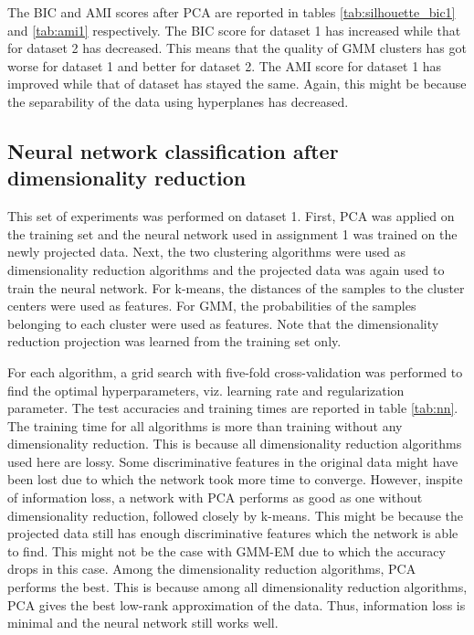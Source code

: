 \documentclass[letterpaper]{article}
\begin{document}
	The BIC and AMI scores after PCA are reported in tables \ref{tab:silhouette_bic1} and \ref{tab:ami1} respectively. The BIC score for dataset 1 has increased while that for dataset 2 has decreased. This means that the quality of GMM clusters has got worse for dataset 1 and better for dataset 2. The AMI score for dataset 1 has improved while that of dataset has stayed the same. Again, this might be because the separability of the data using hyperplanes has decreased.
	
	\subsection{Neural network classification after dimensionality reduction}
	This set of experiments was performed on dataset 1. First, PCA was applied on the training set and the neural network used in assignment 1 was trained on the newly projected data. Next, the two clustering algorithms were used as dimensionality reduction algorithms and the projected data was again used to train the neural network. For k-means, the distances of the samples to the cluster centers were used as features. For GMM, the probabilities of the samples belonging to each cluster were used as features. Note that the dimensionality reduction projection was learned from the training set only.
	
	For each algorithm, a grid search with five-fold cross-validation was performed to find the optimal hyperparameters, viz. learning rate and regularization parameter. The test accuracies and training times are reported in table \ref{tab:nn}. The training time for all algorithms is more than training without any dimensionality reduction. This is because all dimensionality reduction algorithms used here are lossy. Some discriminative features in the original data might have been lost due to which the network took more time to converge. However, inspite of information loss, a network with PCA performs as good as one without dimensionality reduction, followed closely by k-means. This might be because the projected data still has enough discriminative features which the network is able to find. This might not be the case with GMM-EM due to which the accuracy drops in this case. Among the dimensionality reduction algorithms, PCA performs the best. This is because among all dimensionality reduction algorithms, PCA gives the best low-rank approximation of the data. Thus, information loss is minimal and the neural network still works well.
	
\end{document}
